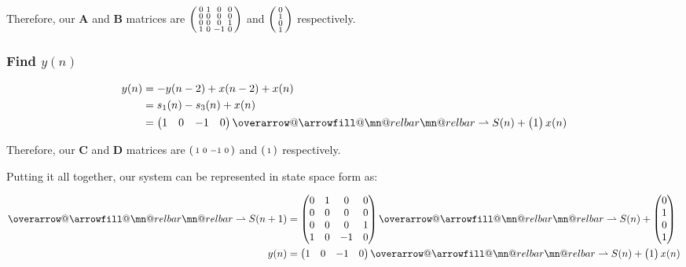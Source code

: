 \documentclass{article}
\makeatletter
\renewcommand{\thesubsubsection}{\thesection.\alph{subsection}.\Roman{subsubsection}}
\DeclareRobustCommand{\overrightharpoon}{\mathpalette{\overarrow@\rightharpoonfill@}}
\def\rightharpoonfill@{\arrowfill@\mn@relbar\mn@relbar\rightharpoonup}
\makeatother
\begin{document}
Therefore, our $\boldsymbol{A}$ and $\boldsymbol{B}$ matrices are $\begin{psmallmatrix} 0 & 1 & 0 & 0 \\ 0 & 0 & 0 & 0 \\ 0 & 0 & 0 & 1 \\ 1 & 0 & -1 & 0 \end{psmallmatrix}$ and $\begin{psmallmatrix} 0 \\ 1 \\ 0 \\ 1 \end{psmallmatrix}$ respectively.

\subsubsection[~\thesubsubsection]{Find $y(n)$}

\begin{align*}
	y(n) &= -y(n - 2) + x(n - 2) + x(n) \\
	&= s_1(n) - s_3(n) + x(n) \\
	&= \begin{pmatrix} 1 & 0 & -1 & 0 \end{pmatrix}\overrightharpoon{S(n)} + \begin{pmatrix} 1 \end{pmatrix}x(n)
\end{align*}

Therefore, our $\boldsymbol{C}$ and $\boldsymbol{D}$ matrices are $\begin{psmallmatrix} 1 & 0 & -1 & 0 \end{psmallmatrix}$ and $\begin{psmallmatrix} 1 \end{psmallmatrix}$ respectively.

Putting it all together, our system can be represented in state space form as:

\begin{align*}
	\overrightharpoon{S(n + 1)} &= \begin{pmatrix} 0 & 1 & 0 & 0 \\ 0 & 0 & 0 & 0 \\ 0 & 0 & 0 & 1 \\ 1 & 0 & -1 & 0 \end{pmatrix}\overrightharpoon{S(n)} + \begin{pmatrix} 0 \\ 1 \\ 0 \\ 1 \end{pmatrix} \\
	y(n) &= \begin{pmatrix} 1 & 0 & -1 & 0 \end{pmatrix}\overrightharpoon{S(n)} + \begin{pmatrix} 1 \end{pmatrix}x(n)
\end{align*}
\end{document}
